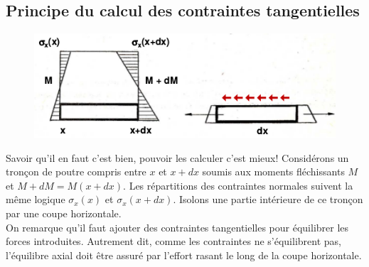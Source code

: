 	\subsection{Principe du calcul des contraintes tangentielles}
	\begin{figure}
	\vspace{-7mm}
	\includegraphics[scale=0.4]{ch5/image2.png}
	\end{figure}
	Savoir qu'il en faut c'est bien, pouvoir les calculer c'est mieux! Considérons 
	un tronçon de poutre compris entre $x$ et $x+dx$ soumis aux moments fléchissants 
	$M$ et $M+dM = M(x+dx)$. Les répartitions des contraintes normales suivent la 
	même logique $\sigma_x(x)$ et $\sigma_x(x+dx)$. Isolons une partie intérieure 
	de ce tronçon par une coupe horizontale.\\	
	On remarque qu'il faut ajouter des contraintes tangentielles pour équilibrer 
	les forces introduites. Autrement dit, comme les contraintes ne s'équilibrent 
	pas, l'équilibre axial doit être assuré par l'effort rasant le long de la 
	coupe horizontale.
	
